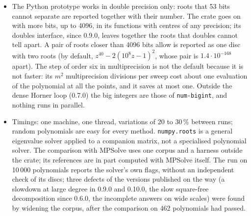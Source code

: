 \documentclass[10pt,a4paper]{article}
\theoremstyle{definition}
\numberwithin{equation}{section}
\begin{document}
\begin{itemize}
 number of sweeps of hundreds of bits on ill-conditioned polynomials (15 to 40) is not explained by the
 local order; it is the price of the approach from the start, as in Section~\ref{sec:start}.
\item The Python prototype works in double precision only: roots that 53 bits cannot separate are
 reported together with their number. The crate goes on with more bits, up to 4096, in its functions with
 centres of any precision; its doubles interface, since 0.9.0, leaves together the roots that doubles
 cannot tell apart. A pair of roots closer than 4096 bits allow is reported as one disc with two roots (by
 default, $z^{40}-2(10^8z-1)^2$, whose pair is $1.4\cdot10^{-168}$ apart).
 The step of order six in multiprecision is not the default because it is not faster: its $m^2$
 multiprecision divisions per sweep cost about one evaluation of the polynomial at all the points, and
 it saves at most one. Outside the dense Horner loop (0.7.0) the big integers are those of
 \texttt{num-bigint}, and nothing runs in parallel.
\item Timings: one machine, one thread, variations of 20 to 30\,\% between runs; random
 polynomials are easy for every method. \texttt{numpy.roots} is a general eigenvalue solver applied to
 a companion matrix, not a specialised polynomial solver. The comparison with MPSolve uses one corpus
 and a harness outside the crate; its references are in part computed with MPSolve itself. The run on
 10\,000 polynomials reports the solver's own flags, without an independent check of its discs; three
 defects of the versions published on the way (a slowdown at large degree in 0.9.0 and 0.10.0, the slow
 square-free decomposition since 0.6.0, the incomplete answers on wide scales) were found by widening the
 corpus, after the comparison on 462 polynomials had passed.
\end{itemize}
\end{document}
